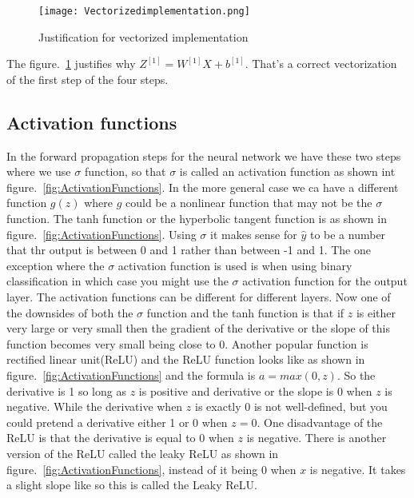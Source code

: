 \documentclass[a4paper]{article}
\begin{document}
\begin{figure}[!htp]
\begin{center}
   \texttt{[image: Vectorizedimplementation.png]}
\end{center}
   \caption{Justification for vectorized implementation~\cite{mooc.com,Coursera.org}}
\label{fig:Vectorizedimplementation}
\end{figure}

The figure.~\ref{fig:Vectorizedimplementation} justifies why $Z^{[1]}=W^{[1]}X+b^{[1]}$. That's a correct vectorization of the first step of the four steps.

\subsection{Activation functions}
In the forward propagation steps for the neural network we have these two steps where we use $\sigma$ function, so that $\sigma$ is called an activation function as shown int figure.~\ref{fig:ActivationFunctions}. In the more general case we ca have a different function $g(z)$ where $g$ could be a nonlinear function that  may not be the $\sigma$ function. The tanh function or the hyperbolic tangent  function is as shown in figure.~\ref{fig:ActivationFunctions}. Using $\sigma$ it makes sense for $\hat{y}$ to be a number that thr output is between 0 and 1 rather than between -1 and 1. The one exception where the $\sigma$ activation function is used is when using binary classification in which case you might use the $\sigma$ activation function for the output layer. The activation functions can be different for different layers. Now one of the downsides of both the $\sigma$ function and the tanh function is that if $z$ is either very large or very small then the gradient of the derivative or the slope of this function becomes very small being close to 0. Another popular function is rectified linear unit(ReLU) and the ReLU function looks like as shown in figure.~\ref{fig:ActivationFunctions} and the formula is $a=max(0,z)$. So the derivative is 1 so long as $z$ is positive and derivative or the slope is 0 when $z$ is negative. While the derivative when $z$ is exactly 0 is not well-defined, but you could pretend a derivative either 1 or 0 when $z=0$. One disadvantage of the ReLU is that the derivative is equal to 0 when $z$ is negative. There is another version of the ReLU called the leaky ReLU as shown in figure.~\ref{fig:ActivationFunctions}, instead of it being 0 when $x$ is negative. It takes a slight slope like so this is called the Leaky ReLU.\par
\end{document}
